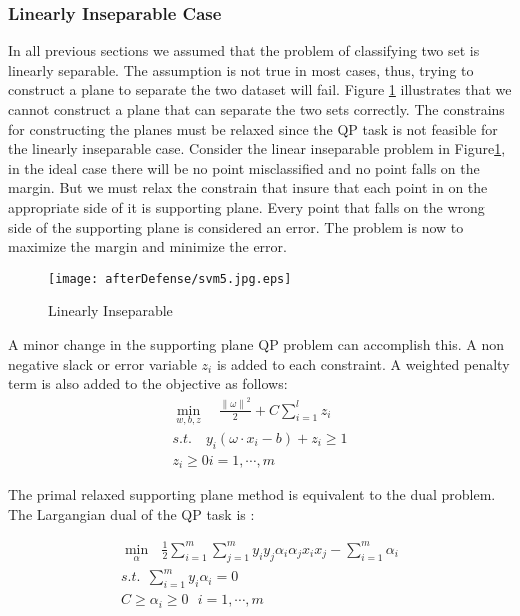 \subsubsection{Linearly Inseparable Case}
In all previous sections we assumed that the problem of classifying two set is linearly separable. The assumption is not true in most cases, thus, trying to construct a plane to separate the two dataset will fail. Figure \ref{fig:svm5} illustrates that we cannot construct a plane that can separate the two sets correctly. The constrains for constructing the planes must be relaxed since the QP task is not feasible for the linearly inseparable case.  Consider the linear inseparable problem in Figure\ref{fig:svm5}, in the ideal case there will be no point misclassified and no point falls on the margin. But we must relax the constrain that insure that each point in on the appropriate side of it is supporting plane. Every point that falls on the wrong side of the supporting plane is considered an error. The problem is now to maximize the margin and minimize the error.  
 
\begin{figure}
	\centering
		\texttt{[image: afterDefense/svm5.jpg.eps]}
	\caption{Linearly Inseparable}
	\label{fig:svm5}
\end{figure}
A minor change in the supporting plane QP problem can accomplish this. A non negative slack or error variable $z_i$ is added to each constraint.  A weighted penalty term is also added to the objective as follows:
 \begin{equation}
 \begin{array}{c}
\min_{w,b,z}  \quad \frac{{\parallel \omega \parallel}^2}{2}+C \sum_{i=1}^{l}z_i  \\
s.t.  \quad y_i(\omega \cdot x_i -b)+z_i \geq 1  \\
    z_i \geq 0  i=1,\cdots,m
\end{array} 
\label{eq:inseperable}
\end{equation} 

The primal relaxed supporting plane method is equivalent to the dual problem. The Largangian dual of the QP task is :

\begin{equation}
\begin{array}{c}
\min_{\alpha} \ \ \   \frac{1}{2} \sum_{i=1}^{m}{\sum_{j=1}^{m}{y_iy_j\alpha_i\alpha_jx_ix_j}} - \sum_{i=1}^{m}{\alpha_i} \\
s.t. \ \ \sum_{i=1}^{m}{y_i\alpha_i}=0   \\
 C \geq \alpha_i \geq 0  \ \ \ i=1,\cdots , m 
 \end{array} 
\label{eq:dual}
\end{equation}



